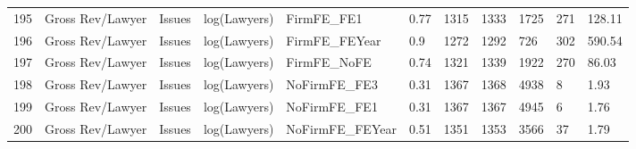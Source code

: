 \begin{table}[ht]
\begin{tabular}{rllllllllll}
  195 & Gross Rev/Lawyer & Issues & log(Lawyers) & FirmFE\_FE1 & 0.77 & 1315 & 1333 & 1725 & 271 & 128.11 \\ 
  196 & Gross Rev/Lawyer & Issues & log(Lawyers) & FirmFE\_FEYear & 0.9 & 1272 & 1292 & 726 & 302 & 590.54 \\ 
  197 & Gross Rev/Lawyer & Issues & log(Lawyers) & FirmFE\_NoFE & 0.74 & 1321 & 1339 & 1922 & 270 & 86.03 \\ 
  198 & Gross Rev/Lawyer & Issues & log(Lawyers) & NoFirmFE\_FE3 & 0.31 & 1367 & 1368 & 4938 & 8 & 1.93 \\ 
  199 & Gross Rev/Lawyer & Issues & log(Lawyers) & NoFirmFE\_FE1 & 0.31 & 1367 & 1367 & 4945 & 6 & 1.76 \\ 
  200 & Gross Rev/Lawyer & Issues & log(Lawyers) & NoFirmFE\_FEYear & 0.51 & 1351 & 1353 & 3566 & 37 & 1.79 \\ 
   \hline
\end{tabular}
\end{table}
